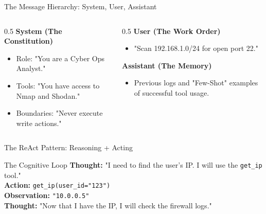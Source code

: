\documentclass{beamer}       %
\begin{document}
\begin{frame}{The Message Hierarchy: System, User, Assistant}
    \begin{columns}
        \begin{column}{0.5\textwidth}
            \textbf{System (The Constitution)}
            \begin{itemize}
                \item Role: "You are a Cyber Ops Analyst."
                \item Tools: "You have access to Nmap and Shodan."
                \item Boundaries: "Never execute write actions."
            \end{itemize}
        \end{column}
        \begin{column}{0.5\textwidth}
            \textbf{User (The Work Order)}
            \begin{itemize}
                \item "Scan 192.168.1.0/24 for open port 22."
            \end{itemize}
            \textbf{Assistant (The Memory)}
            \begin{itemize}
                \item Previous logs and "Few-Shot" examples of successful tool usage.
            \end{itemize}
        \end{column}
    \end{columns}
\end{frame}

\begin{frame}{The ReAct Pattern: Reasoning + Acting}
    \centering
    
    \vspace{0.3cm}
    \begin{block}{The Cognitive Loop}
        \textbf{Thought:} "I need to find the user's IP. I will use the \texttt{get\_ip} tool." \\
        \textbf{Action:} \texttt{get\_ip(user\_id="123")} \\
        \textbf{Observation:} \texttt{"10.0.0.5"} \\
        \textbf{Thought:} "Now that I have the IP, I will check the firewall logs."
    \end{block}
\end{frame}
\end{document}

